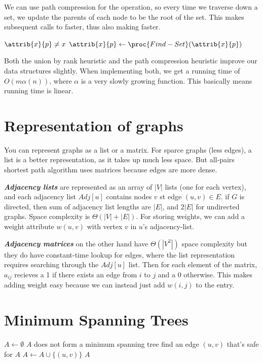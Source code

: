 \documentclass[11pt]{article}
\theoremstyle{definition}
\begin{document}
We can use path compression for the  operation, so every time we traverse down 
a set, we update the parents of each node to be the root of the set.  This makes subsequent calls 
to  faster, thus also making  faster.

\begin{codebox}
  \li \If \(\attrib{x}{p} \neq x\) \Then 
    \li \(\attrib{x}{p} \gets \proc{Find-Set}(\attrib{x}{p})\) \End
  \li \Return {}
\end{codebox}

Both the union by rank heuristic and the path compression heuristic improve our data structures 
slightly.  When implementing both, we get a running time of \(O(m\alpha(n))\), where \(\alpha\) 
is a very slowly growing function.  This basically means running time is linear.

\section*{Representation of graphs}
You can represent graphs as a list or a matrix.  For sparce graphs (less edges), a list is a 
better representation, as it takes up much less space.  But all-pairs shortest path algorithm 
uses matrices because edges are more dense.

\textbf{\textit{Adjacency lists}} are represented as an array of \(|V|\) lists (one for each 
vertex), and each adjacency list \(Adj[u]\) contains nodes \(v\) st edge \((u,v) \in E\).  if 
\(G\) is directed, then sum of adjacency list lengths are \(|E|\), and \(2|E|\) for undirected 
graphs.  Space complexity is \(\Theta(|V|+|E|)\).  For storing weights, we can add a weight 
attribute \(w(u,v)\) with vertex \(v\) in \(u\)'s adjacency-list.

\textbf{\textit{Adjacency matrices}} on the other hand have \(\Theta(|V^2|)\) space complexity 
but they do have constant-time lookup for edges, where the list representation requires searching 
through the \(Adj[u]\) list.  Then for each element of the matrix, \(a_{ij}\) recieves a 1 if 
there exists an edge from \(i\) to \(j\) and a 0 otherwise.  This makes adding weight easy because 
we can instead just add \(w(i,j)\) to the entry.
\newpage

\section*{Minimum Spanning Trees}
\begin{codebox}
  \li \(A \gets \emptyset\)
  \li \While \(A\) does not form a minimum spanning tree \Do
    \li find an edge \((u,v)\) that's safe for \(A\) 
    \li \(A \gets A \cup \{(u,v)\}\) \End
  \li \Return \(A\)
\end{codebox}
\end{document}
